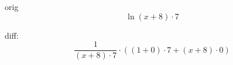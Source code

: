 \documentclass[a4paper, 12pt]{article}
\begin{document}
                          
orig \[  \ln {{\left({x + 8}\right) \cdot 7}}  \]

diff: \[ { \frac {1} {{\left({x + 8}\right) \cdot 7}} \cdot \left({{\left({1 + 0}\right) \cdot 7} + {\left({x + 8}\right) \cdot 0}}\right)} \]
\end{document}
